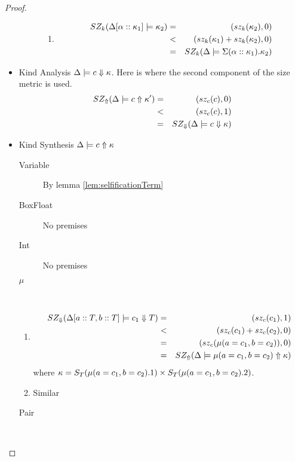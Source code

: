 \documentclass[12pt,twoside,fleqn]{amsart}
\theoremstyle{plain}
\theoremstyle{plain}
\theoremstyle{definition}
\begin{document}
\begin{proof}
\begin{itemize}
\begin{description}
\begin{enumerate}
\item 
\begin{eqnarray*}
SZ_k(\Delta  [\alpha   ::\kappa _{1}  ]  \models \kappa _{2} ) & = & (sz_k(\kappa _{2}),0)\\
 & < & (sz_k(\kappa _{1})+sz_k(\kappa _{2}),0)\\
 & = & SZ_k(\Delta   \models \Sigma (\alpha ::\kappa _{1}).\kappa _{2} )
\end{eqnarray*}

\end{enumerate}
\end{description}
\item Kind Analysis \( \Delta  \models c \Downarrow \kappa  \). Here is where the second
component of the size metric is used.
\begin{eqnarray*}
SZ_{\Uparrow }(\Delta   \models c  \Uparrow \kappa '  ) & = & (sz_{c}(c ),0)\\
 & < & (sz_{c}(c ),1)\\
 & = & SZ_{\Downarrow }(\Delta   \models c  \Downarrow \kappa   )
\end{eqnarray*}

\item Kind Synthesis \( \Delta  \models c \Uparrow \kappa  \)

\begin{description}
\item [Variable]By lemma \ref{lem:selfificationTerm}
\item [BoxFloat]No premises
\item [Int]No premises
\item [\( \mu  \)]~
\end{description}
\begin{enumerate}
\item 
\begin{eqnarray*}
SZ_{\Downarrow }(\Delta [a::T,b::T]  \models c_{1}  \Downarrow T  ) & = & (sz_{c}(c_{1} ),1)\\
 & < & (sz_{c}(c_{1} )+sz_{c}(c_{2} ),0)\\
 & = & (sz_{c}(\mu (a=c_{1},b=c_{2}) ),0)\\
 & = & SZ_{\Uparrow }(\Delta  \models \mu (a=c_{1},b=c_{2}) \Uparrow \kappa  )
\end{eqnarray*}
where \( \kappa =S_{T}(\mu (a=c_{1},b=c_{2}).1 )\times S_{T}(\mu (a=c_{1},b=c_{2}).2 ) \).\\

\item Similar
\end{enumerate}
\begin{description}
\item [Pair]~


\end{description}
\end{itemize}
\end{proof}
\end{document}

